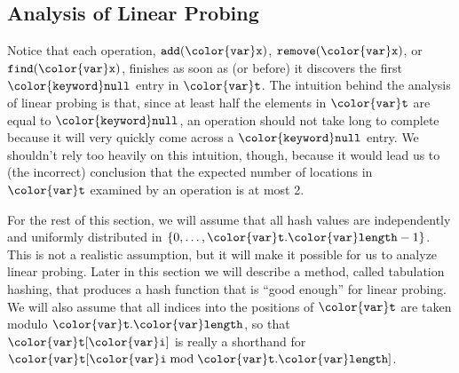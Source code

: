 \documentclass[10pt]{book}
\theoremstyle{plain}
\theoremstyle{definition}
\begin{document}
\subsection{Analysis of Linear Probing}

Notice that each operation, \ensuremath{\mathtt{add({\color{var}x})}}, \ensuremath{\mathtt{remove({\color{var}x})}}, or \ensuremath{\mathtt{find({\color{var}x})}}, finishes
as soon as (or before) it discovers the first \ensuremath{\mathtt{{\color{keyword}null}}} entry in \ensuremath{\mathtt{{\color{var}t}}}.
The intuition behind the analysis of linear probing is that, since at
least half the elements in \ensuremath{\mathtt{{\color{var}t}}} are equal to \ensuremath{\mathtt{{\color{keyword}null}}}, an operation should
not take long to complete because it will very quickly come across a
\ensuremath{\mathtt{{\color{keyword}null}}} entry.  We shouldn't rely too heavily on this intuition, though,
because it would lead us to (the incorrect) conclusion that the expected
number of locations in \ensuremath{\mathtt{{\color{var}t}}} examined by an operation is at most 2.

For the rest of this section, we will assume that all hash values are
independently and uniformly distributed in $\{0,\ldots,\ensuremath{\mathtt{{\color{var}t}.{\color{var}length}}}-1\}$.
This is not a realistic assumption, but it will make it possible for
us to analyze linear probing.  Later in this section we will describe a
method, called tabulation hashing, that produces a hash function that is
``good enough'' for linear probing.  We will also assume that all indices
into the positions of \ensuremath{\mathtt{{\color{var}t}}} are taken modulo \ensuremath{\mathtt{{\color{var}t}.{\color{var}length}}}, so that \ensuremath{\mathtt{{\color{var}t}[{\color{var}i}]}}
is really a shorthand for $\ensuremath{\mathtt{{\color{var}t}}}[\ensuremath{\mathtt{{\color{var}i}}}\bmod\ensuremath{\mathtt{{\color{var}t}.{\color{var}length}}}]$.
\end{document}
